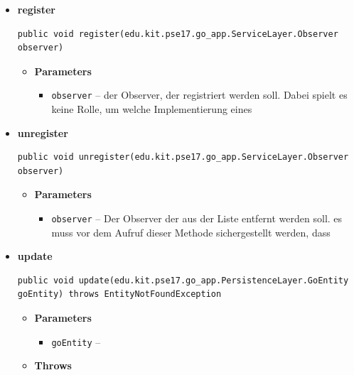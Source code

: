 \documentclass[11pt,a4paper]{article}
\begin{document}
{{{{{{{{{{{{{\begin{itemize}
{\begin{itemize}
{}%
\end{itemize}
}%
\item{ 
\hypertarget{edu.kit.pse17.go_app.PersistenceLayer.daos.GoDaoImp.register(edu.kit.pse17.go_app.ServiceLayer.Observer)}{{\bf  register}\\}
\begin{lstlisting}[frame=none]
public void register(edu.kit.pse17.go_app.ServiceLayer.Observer observer)\end{lstlisting} %
\begin{itemize}
\item{
{\bf  Parameters}
  \begin{itemize}
   \item{
\texttt{observer} -- der Observer, der registriert werden soll. Dabei spielt es keine Rolle, um welche Implementierung eines}
  \end{itemize}
}%
\end{itemize}
}%
\item{ 
\hypertarget{edu.kit.pse17.go_app.PersistenceLayer.daos.GoDaoImp.unregister(edu.kit.pse17.go_app.ServiceLayer.Observer)}{{\bf  unregister}\\}
\begin{lstlisting}[frame=none]
public void unregister(edu.kit.pse17.go_app.ServiceLayer.Observer observer)\end{lstlisting} %
\begin{itemize}
\item{
{\bf  Parameters}
  \begin{itemize}
   \item{
\texttt{observer} -- Der Observer der aus der Liste entfernt werden soll. es muss vor dem Aufruf dieser Methode sichergestellt werden, dass}
  \end{itemize}
}%
\end{itemize}
}%
\item{ 
\hypertarget{edu.kit.pse17.go_app.PersistenceLayer.daos.GoDaoImp.update(edu.kit.pse17.go_app.PersistenceLayer.GoEntity)}{{\bf  update}\\}
\begin{lstlisting}[frame=none]
public void update(edu.kit.pse17.go_app.PersistenceLayer.GoEntity goEntity) throws EntityNotFoundException\end{lstlisting} %
\begin{itemize}
\item{
{\bf  Parameters}
  \begin{itemize}
   \item{
\texttt{goEntity} -- }
  \end{itemize}
}%
\item{{\bf  Throws}
}%
\end{itemize}
}%
\end{itemize}
}
}
}}}}}}}}}}}
\end{document}
